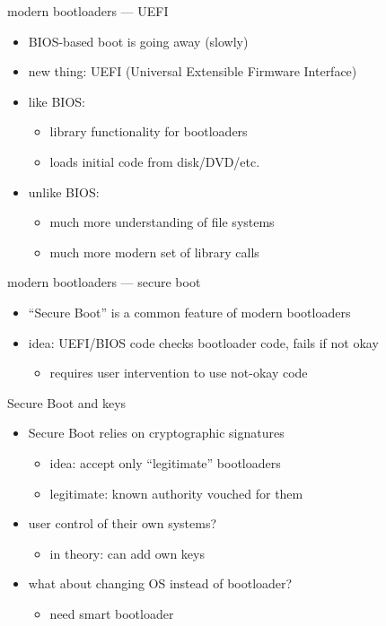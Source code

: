 \begin{frame}{modern bootloaders --- UEFI}
    \begin{itemize}
    \item BIOS-based boot is going away (slowly)
    \item new thing: UEFI (Universal Extensible Firmware Interface)
    \item like BIOS:
        \begin{itemize}
        \item library functionality for bootloaders
        \item loads initial code from disk/DVD/etc.
        \end{itemize}
    \item unlike BIOS:
        \begin{itemize}
        \item much more understanding of file systems
        \item much more modern set of library calls
        \end{itemize}
    \end{itemize}
\end{frame}

\begin{frame}{modern bootloaders --- secure boot}
    \begin{itemize}
    \item ``Secure Boot'' is a common feature of modern bootloaders
    \item idea: UEFI/BIOS code checks bootloader code, fails if not okay
        \begin{itemize}
        \item requires user intervention to use not-okay code
        \end{itemize}
    \end{itemize}
\end{frame}

\begin{frame}{Secure Boot and keys}
    \begin{itemize}
    \item Secure Boot relies on cryptographic signatures
        \begin{itemize}
        \item idea: accept only ``legitimate'' bootloaders
        \item legitimate: known authority vouched for them
        \end{itemize}
    \item user control of their own systems?
        \begin{itemize}
        \item in theory: can add own keys
        \end{itemize}
    \item what about changing OS instead of bootloader?
        \begin{itemize}
        \item need smart bootloader
        \end{itemize}
    \end{itemize}
\end{frame}

